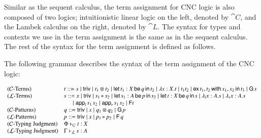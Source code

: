 Similar as the sequent calculus, the term assignment for CNC logic is
also composed of two logics; intuitionistic linear logic on the left,
denoted by $\cat{C}$, and the Lambek calculus on the right, denoted by
$\cat{L}$. The syntax for types and contexts we use in the term
assignment is the same as in the sequent calculus. The rest of the
syntax for the term assignment is defined as follows.
\begin{definition}
  \label{def:Lambek-syntax}
  The following grammar describes the syntax of the term assignment of the
  CNC logic:
  \begin{center}\vspace{-3px}\small
    \begin{math}
      \begin{array}{lll}        
        \text{($\mathcal{C}$-Terms)} & \mathit{t} ::= \mathit{x} \mid  \mathsf{triv}  \mid \mathit{t_{{\mathrm{1}}}}  \otimes  \mathit{t_{{\mathrm{2}}}} \mid  \mathsf{let}\, \mathit{t_{{\mathrm{1}}}}  :  \mathit{X} \,\mathsf{be}\, \mathit{q} \,\mathsf{in}\, \mathit{t_{{\mathrm{2}}}}  \mid  \lambda  \mathit{x}  :  \mathit{X} . \mathit{t}  \mid  \mathit{t_{{\mathrm{1}}}}   \mathit{t_{{\mathrm{2}}}}  \mid  \mathsf{ex}\, \mathit{t_{{\mathrm{1}}}} , \mathit{t_{{\mathrm{2}}}} \,\mathsf{with}\, \mathit{x_{{\mathrm{1}}}} , \mathit{x_{{\mathrm{2}}}} \,\mathsf{in}\, \mathit{t_{{\mathrm{3}}}}  \mid  \mathsf{G}\, \mathit{s} \\
        \text{($\mathcal{L}$-Terms)} & \mathit{s} ::= \mathit{x} \mid  \mathsf{triv}  \mid \mathit{s_{{\mathrm{1}}}}  \triangleright  \mathit{s_{{\mathrm{2}}}} \mid  \mathsf{let}\, \mathit{s_{{\mathrm{1}}}}  :  \mathit{A} \,\mathsf{be}\, \mathit{p} \,\mathsf{in}\, \mathit{s_{{\mathrm{2}}}}  \mid  \mathsf{let}\, \mathit{t}  :  \mathit{X} \,\mathsf{be}\, \mathit{q} \,\mathsf{in}\, \mathit{s}  \mid  \lambda_l  \mathit{x}  :  \mathit{A} . \mathit{s}  \mid  \lambda_r  \mathit{x}  :  \mathit{A} . \mathit{s}  \\
        & \,\,\,\,\,\,\,\,\,\mid  \mathsf{app}_l\, \mathit{s_{{\mathrm{1}}}} \, \mathit{s_{{\mathrm{2}}}}  \mid  \mathsf{app}_r\, \mathit{s_{{\mathrm{1}}}} \, \mathit{s_{{\mathrm{2}}}}  \mid  \mathsf{F} \mathit{t} \\        
        \text{($\mathcal{C}$-Patterns)} & \mathit{q} ::=  \mathsf{triv}  \mid \mathit{x} \mid \mathit{q_{{\mathrm{1}}}}  \otimes  \mathit{q_{{\mathrm{2}}}} \mid  \mathsf{G}\, \mathit{p} \\
        \text{($\mathcal{L}$-Patterns)} & \mathit{p} ::=  \mathsf{triv}  \mid \mathit{x} \mid \mathit{p_{{\mathrm{1}}}}  \triangleright  \mathit{p_{{\mathrm{2}}}} \mid  \mathsf{F}\, \mathit{q} \\        
        \text{($\mathcal{C}$-Typing Judgment)} & \Phi  \vdash_\mathcal{C}  \mathit{t}  :  \mathit{X}\\
        \text{($\mathcal{L}$-Typing Judgment)} & \Gamma  \vdash_\mathcal{L}  \mathit{s}  :  \mathit{A}\\
      \end{array}
    \end{math}
  \end{center}
\end{definition}

